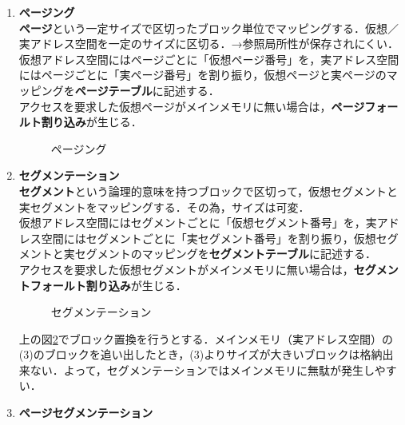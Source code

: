\begin{enumerate}[label=\textbf{(\Alph*)}, labelsep=10pt, leftmargin=23pt]
	\item \textbf{ページング}\\
		\textbf{ページ}という一定サイズで区切ったブロック単位でマッピングする．仮想／実アドレス空間を一定のサイズに区切る．→参照局所性が保存されにくい．\\
		仮想アドレス空間にはページごとに「仮想ページ番号」を，実アドレス空間にはページごとに「実ページ番号」を割り振り，仮想ページと実ページのマッピングを\textbf{ページテーブル}に記述する．\\
		アクセスを要求した仮想ページがメインメモリに無い場合は，\textbf{ページフォールト割り込み}が生じる．
		\begin{figure}[H]
			\begin{center}
				\caption{ページング}
				\label{fig:com_arch-8}
			\end{center}
		\end{figure}
	\item \textbf{セグメンテーション}\\
		\textbf{セグメント}という論理的意味を持つブロックで区切って，仮想セグメントと実セグメントをマッピングする．その為，サイズは可変．\\
		仮想アドレス空間にはセグメントごとに「仮想セグメント番号」を，実アドレス空間にはセグメントごとに「実セグメント番号」を割り振り，仮想セグメントと実セグメントのマッピングを\textbf{セグメントテーブル}に記述する．\\
		アクセスを要求した仮想セグメントがメインメモリに無い場合は，\textbf{セグメントフォールト割り込み}が生じる．
		\begin{figure}[H]
			\begin{center}
				\caption{セグメンテーション}
				\label{fig:com_arch-9}
			\end{center}
		\end{figure}
		上の図\ref{fig:com_arch-9}でブロック置換を行うとする．メインメモリ（実アドレス空間）の(3)のブロックを追い出したとき，(3)よりサイズが大きいブロックは格納出来ない．よって，セグメンテーションではメインメモリに無駄が発生しやすい．
	\item \textbf{ページセグメンテーション}\\

\end{enumerate}
